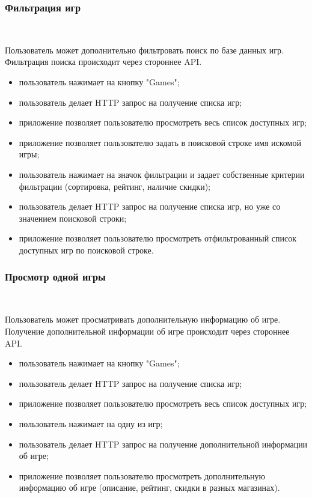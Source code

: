 \subsubsection{Фильтрация игр}~\par

Пользователь может дополнительно фильтровать поиск по базе данных игр. Фильтрация поиска происходит через стороннее API.


\begin{itemize}
  \item пользователь нажимает на кнопку "Games";
  \item пользователь делает HTTP запрос на получение списка игр;
  \item приложение позволяет пользователю просмотреть весь список доступных игр;
  \item приложение позволяет пользователю задать в поисковой строке имя искомой игры;
  \item пользователь нажимает на значок фильтрации и задает собственные критерии фильтрации (сортировка, рейтинг, наличие скидки);
  \item пользователь делает HTTP запрос на получение списка игр, но уже со значением поисковой строки;
  \item приложение позволяет пользователю просмотреть отфильтрованный список доступных игр по поисковой строке.
\end{itemize}

\subsubsection{Просмотр одной игры}~\par

Пользователь может просматривать дополнительную информацию об игре. Получение дополнительной информации об игре происходит через стороннее API.

\begin{itemize}
  \item пользователь нажимает на кнопку "Games";
  \item пользователь делает HTTP запрос на получение списка игр;
  \item приложение позволяет пользователю просмотреть весь список доступных игр;
  \item пользователь нажимает на одну из игр;
  \item пользователь делает HTTP запрос на получение дополнительной информации об игре;
  \item приложение позволяет пользователю просмотреть дополнительную информацию об игре (описание, рейтинг, скидки в разных магазинах).
\end{itemize}


